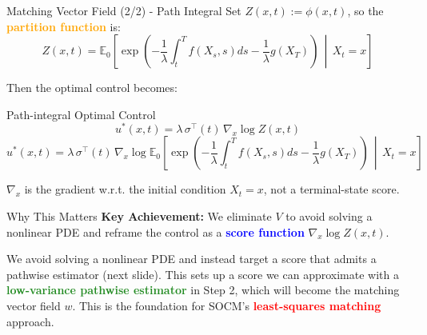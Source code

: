 \documentclass[aspectratio=169,xcolor=dvipsnames]{beamer}
\begin{document}
\begin{frame}[allowframebreaks]{Matching Vector Field (2/2) - Path Integral}
    Set $Z(x,t) := \phi(x,t)$, so the \textcolor{orange}{\textbf{partition function}} is:
    $$Z(x,t) = \mathbb{E}_0\left[\exp\left(-\frac{1}{\lambda}\int_t^T f(X_s,s) ds - \frac{1}{\lambda} g(X_T)\right) \,\middle|\, X_t = x\right]$$
    
    Then the optimal control becomes:

    \begin{alertblock}{Path-integral Optimal Control}
        $$u^*(x,t) = \lambda \, \sigma^\top(t) \, \nabla_x \log Z(x,t)$$
        $$u^*(x,t) = \lambda \, \sigma^\top(t) \, \nabla_x \log \mathbb{E}_0\left[\exp\left(-\frac{1}{\lambda}\int_t^T f(X_s,s) ds - \frac{1}{\lambda} g(X_T)\right) \,\middle|\, X_t = x\right]$$

        \footnotesize{$\nabla_x$ is the gradient w.r.t. the initial condition $X_t = x$, not a terminal-state score.}
    \end{alertblock}
    
    \vspace{-0.3cm}

    \begin{block}{Why This Matters}
        \textbf{Key Achievement:} We eliminate $V$ to avoid solving a nonlinear PDE and reframe the control as a \textcolor{blue}{\textbf{score function}} $\nabla_x \log Z(x,t)$.
        
        \vspace{0.3cm}
        
        We avoid solving a nonlinear PDE and instead target a score that admits a pathwise estimator (next slide). This sets up a score we can approximate with a \textcolor{ForestGreen}{\textbf{low-variance pathwise estimator}} in Step 2, which will become the matching vector field $w$. This is the foundation for SOCM's \textcolor{red}{\textbf{least-squares matching}} approach.
    \end{block}
    
    \framebreak
\end{frame}
\end{document}

